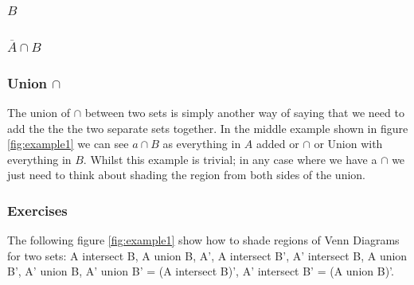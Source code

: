 \subsubsection{$ B$}


\subsubsection{$ \overline{A} \cap B$}


\subsubsection{Union $\cap$}

The union of $\cap$ between two sets is simply another way of saying that we need to add the the the two separate sets together. In the middle example shown in figure \ref{fig:example1} we can see $ a \cap B$ as everything in $A$ added or $\cap$ or Union with everything in $B$. Whilst this example is trivial; in any case where we have a $\cap$ we just need to think about shading the region from both sides of the union.

\subsubsection{Exercises}

The following figure \ref{fig:example1} show how to shade regions of Venn Diagrams for two sets:
A intersect B, A union B, A', A intersect B', A' intersect B, A union B',
A' union B, A' union B' = (A intersect B)', A' intersect B' = (A union B)'.

